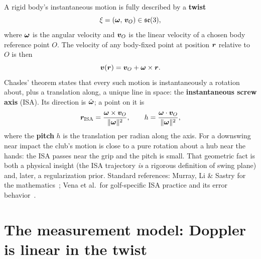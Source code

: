 A rigid body's instantaneous motion is fully described by a \textbf{twist}
\begin{equation}
\label{eq:screw-twist}
\xi = (\bm{\omega},\, \bm{v}_O) \in \mathfrak{se}(3),
\end{equation}
where $\bm{\omega}$ is the angular velocity and $\bm{v}_O$ is the linear velocity of a chosen body reference point $O$.
The velocity of any body-fixed point at position $\bm{r}$ relative to $O$ is then
\begin{equation}
\label{eq:screw-pointvel}
\bm{v}(\bm{r}) = \bm{v}_O + \bm{\omega} \times \bm{r}.
\end{equation}
Chasles' theorem states that every such motion is instantaneously a rotation about, plus a translation along, a unique line in space: the \textbf{instantaneous screw axis} (ISA).
Its direction is $\hat{\bm{\omega}}$; a point on it is
\begin{equation}
\label{eq:screw-isa}
\bm{r}_{\mathrm{ISA}} = \frac{\bm{\omega} \times \bm{v}_O}{\lVert\bm{\omega}\rVert^{2}},
\qquad
h = \frac{\bm{\omega} \cdot \bm{v}_O}{\lVert\bm{\omega}\rVert^{2}},
\end{equation}
where the \textbf{pitch} $h$ is the translation per radian along the axis.
For a downswing near impact the club's motion is close to a pure rotation about a hub near the hands: the ISA passes near the grip and the pitch is small.
That geometric fact is both a physical insight (the ISA trajectory \emph{is} a rigorous definition of swing plane) and, later, a regularization prior.
Standard references: Murray, Li \& Sastry for the mathematics~\cite{murrayliss}; Vena et al.\ for golf-specific ISA practice and its error behavior~\cite{vena2010a}.

\section{The measurement model: Doppler is linear in the twist}
\label{sec:screw-measurement}

